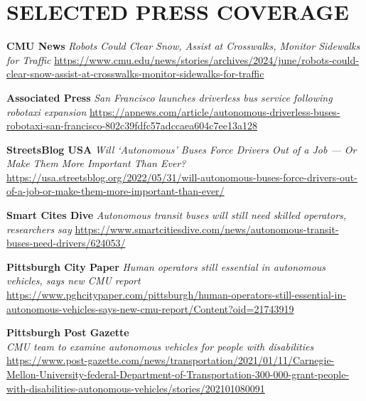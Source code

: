 \documentclass[11pt]{article} %
\begin{document}

\section*{SELECTED PRESS COVERAGE}

\textbf{CMU News}
\textit{Robots Could Clear Snow, Assist at Crosswalks, Monitor Sidewalks for Traffic}
\sloppy
\href{https://www.cmu.edu/news/stories/archives/2024/june/robots-could-clear-snow-assist-at-crosswalks-monitor-sidewalks-for-traffic}{https://www.cmu.edu/news/stories/archives/2024/june/robots-could-clear-snow-assist-at-crosswalks-monitor-sidewalks-for-traffic}

\textbf{Associated Press}
\textit{San Francisco launches driverless bus service following robotaxi expansion}
\sloppy
\href{https://apnews.com/article/autonomous-driverless-buses-robotaxi-san-francisco-802c39fdfc57adccaea604c7ee13a128}{https://apnews.com/article/autonomous-driverless-buses-robotaxi-san-francisco-802c39fdfc57adccaea604c7ee13a128}

\textbf{StreetsBlog USA}
\textit{Will ‘Autonomous’ Buses Force Drivers Out of a Job — Or Make Them More Important Than Ever?}
\sloppy
\href{https://usa.streetsblog.org/2022/05/31/will-autonomous-buses-force-drivers-out-of-a-job-or-make-them-more-important-than-ever/}{https://usa.streetsblog.org/2022/05/31/will-autonomous-buses-force-drivers-out-of-a-job-or-make-them-more-important-than-ever/}

\textbf{Smart Cites Dive}
\textit{Autonomous transit buses will still need skilled operators, researchers say}
\href{https://www.smartcitiesdive.com/news/autonomous-transit-buses-need-drivers/624053/}{https://www.smartcitiesdive.com/news/autonomous-transit-buses-need-drivers/624053/}

\textbf{Pittsburgh City Paper}
\textit{Human operators still essential in autonomous vehicles, says new CMU report}
\href{https://www.pghcitypaper.com/pittsburgh/human-operators-still-essential-in-autonomous-vehicles-says-new-cmu-report/Content?oid=21743919}{https://www.pghcitypaper.com/pittsburgh/human-operators-still-essential-in-autonomous-vehicles-says-new-cmu-report/Content?oid=21743919}

 \textbf{Pittsburgh Post Gazette}\\
\textit{CMU team to examine autonomous vehicles for people with disabilities}\\
\sloppy
\href{https://www.post-gazette.com/news/transportation/2021/01/11/Carnegie-Mellon-University-federal-Department-of-Transportation-300-000-grant-people-with-disabilities-autonomous-vehicles/stories/202101080091}{https://www.post-gazette.com/news/transportation/2021/01/11/Carnegie-Mellon-University-federal-Department-of-Transportation-300-000-grant-people-with-disabilities-autonomous-vehicles/stories/202101080091}
\end{document}
